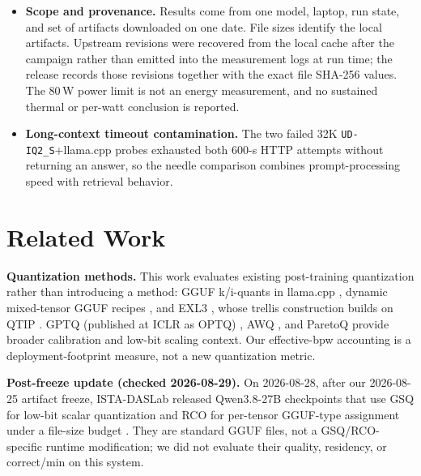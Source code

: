 \documentclass[11pt]{article}
\newcommand{\q}[1]{\texttt{#1}}
\begin{document}
\begin{itemize}
  no matching EXL3 microbenchmark was collected. Cross-engine ratios in
  \S\ref{sec:exl3} instead use engine-reported generation metrics on the same
  evaluation workloads. Correct/min uses logged HTTP-response wall time and is
  the more comparable deployment measure; it excludes local scoring time.
  \item \textbf{Scope and provenance.} Results come from one model, laptop,
  run state, and set of artifacts downloaded on one date. File sizes identify
  the local artifacts. Upstream revisions were recovered from the local cache
  after the campaign rather than emitted into the measurement logs at run
  time; the release records those revisions together with the exact file
  SHA-256 values. The 80\,W power limit is not an energy measurement, and no
  sustained thermal or per-watt conclusion is reported.
  \item \textbf{Long-context timeout contamination.} The two failed 32K
  \q{UD-IQ2\_S}+llama.cpp probes exhausted both 600-s HTTP attempts without
  returning an answer, so the needle comparison combines prompt-processing
  speed with retrieval behavior.
\end{itemize}



\section{Related Work}
\label{sec:related}

\textbf{Quantization methods.} This work evaluates existing post-training
quantization rather than introducing a method: GGUF k/i-quants in llama.cpp
\citep{gerganov2023llamacpp}, dynamic mixed-tensor GGUF recipes
\citep{unsloth2026dynamic}, and EXL3 \citep{turboderp2025exllamav3}, whose
trellis construction builds on QTIP \citep{tseng2024qtip}. GPTQ (published at
ICLR as OPTQ)
\citep{frantar2022gptq}, AWQ \citep{lin2023awq}, and ParetoQ
\citep{liu2025paretoq} provide broader calibration and low-bit scaling context.
Our effective-bpw accounting is a deployment-footprint measure, not a new
quantization metric.

\textbf{Post-freeze update (checked 2026-08-29).}
On 2026-08-28, after our 2026-08-25 artifact freeze, ISTA-DASLab released
Qwen3.8-27B checkpoints that use GSQ for low-bit scalar quantization and RCO
for per-tensor GGUF-type assignment under a file-size budget
\citep{dadgarnia2026gsq,helcig2026rco,istadaslab2026qwen38gsqrco}. They are
standard GGUF files, not a GSQ/RCO-specific runtime modification; we did not
evaluate their quality, residency, or correct/min on this system.
\end{document}
